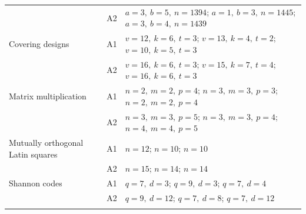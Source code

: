 \begin{longtable}{@{}P{.30\linewidth}lP{.56\linewidth}@{}}
 & A2 & $a=3,\ b=5,\ n=1394$; $a=1,\ b=3,\ n=1445$; $a=3,\ b=4,\ n=1439$ \\
\addlinespace[4pt]
Covering designs & A1 & $v=12,\ k=6,\ t=3$; $v=13,\ k=4,\ t=2$; $v=10,\ k=5,\ t=3$ \\
 & A2 & $v=16,\ k=6,\ t=3$; $v=15,\ k=7,\ t=4$; $v=16,\ k=6,\ t=3$ \\
\addlinespace[4pt]
Matrix multiplication & A1 & $n=2,\ m=2,\ p=4$; $n=3,\ m=3,\ p=3$; $n=2,\ m=2,\ p=4$ \\
 & A2 & $n=3,\ m=3,\ p=5$; $n=3,\ m=3,\ p=4$; $n=4,\ m=4,\ p=5$ \\
\addlinespace[4pt]
Mutually orthogonal Latin squares & A1 & $n=12$; $n=10$; $n=10$ \\
 & A2 & $n=15$; $n=14$; $n=14$ \\
\addlinespace[4pt]
Shannon codes & A1 & $q=7,\ d=3$; $q=9,\ d=3$; $q=7,\ d=4$ \\
 & A2 & $q=9,\ d=12$; $q=7,\ d=8$; $q=7,\ d=12$ \\
\addlinespace[4pt]
\end{longtable}
